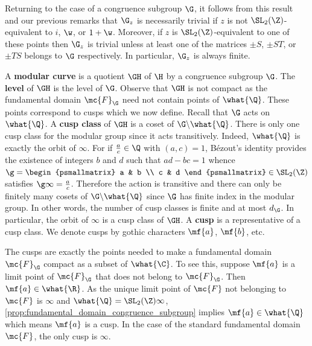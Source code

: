 \documentclass[12pt]{article}
\begin{document}
      Returning to the case of a congruence subgroup \(\G\), it follows from this result and our previous remarks that \(\G_{z}\) is necessarily trivial if \(z\) is not \(\SL_{2}(\Z)\)-equivalent to \(i\), \(\w\), or \(1+\w\). Moreover, if \(z\) is \(\SL_{2}(\Z)\)-equivalent to one of these points then \(\G_{z}\) is trivial unless at least one of the matrices \(\pm S\), \(\pm ST\), or \(\pm TS\) belongs to \(\G\) respectively. In particular, \(\G_{z}\) is always finite.

      A \textbf{modular curve} is a quotient \(\GH\) of \(\H\) by a congruence subgroup \(\G\). The \textbf{level} of \(\GH\) is the level of \(\G\). Observe that \(\GH\) is not compact as the fundamental domain \(\mc{F}_{\G}\) need not contain points of \(\what{\Q}\). These points correspond to cusps which we now define. Recall that \(\G\) acts on \(\what{\Q}\). A \textbf{cusp class} of \(\GH\) is a coset of \(\G\backslash\what{\Q}\). There is only one cusp class for the modular group since it acts transitively. Indeed, \(\what{\Q}\) is exactly the orbit of \(\infty\). For if \(\frac{a}{c} \in \Q\) with \((a,c) = 1\), B\'ezout's identity provides the existence of integers \(b\) and \(d\) such that \(ad-bc = 1\) whence \(\g = \begin{psmallmatrix} a & b \\ c & d \end{psmallmatrix} \in \SL_{2}(\Z)\) satisfies \(\g\infty = \frac{a}{c}\). Therefore the action is transitive and there can only be finitely many cosets of \(\G\backslash\what{\Q}\) since \(\G\) has finite index in the modular group. In other words, the number of cusp classes is finite and at most \(d_{\G}\). In particular, the orbit of \(\infty\) is a cusp class of \(\GH\). A \textbf{cusp} is a representative of a cusp class. We denote cusps by gothic characters \(\mf{a}\), \(\mf{b}\), etc.

      \begin{remark}
        The cusps are exactly the points needed to make a fundamental domain \(\mc{F}_{\G}\) compact as a subset of \(\what{\C}\). To see this, suppose \(\mf{a}\) is a limit point of \(\mc{F}_{\G}\) that does not belong to \(\mc{F}_{\G}\). Then \(\mf{a} \in \what{\R}\). As the unique limit point of \(\mc{F}\) not belonging to \(\mc{F}\) is \(\infty\) and \(\what{\Q} = \SL_{2}(\Z)\infty\), \cref{prop:fundamental_domain_congruence_subgroup} implies \(\mf{a} \in \what{\Q}\) which means \(\mf{a}\) is a cusp. In the case of the standard fundamental domain \(\mc{F}\), the only cusp is \(\infty\).
      \end{remark}
\end{document}
